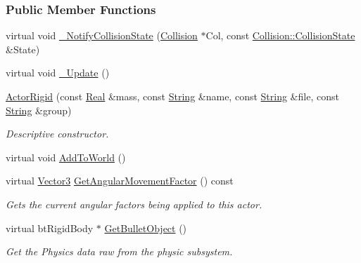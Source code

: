 \subsubsection*{Public Member Functions}
\begin{DoxyCompactItemize}
\item 
virtual void \hyperlink{classMezzanine_1_1ActorRigid_a68827280395bc3b9e0266710ec44247d}{\_\-NotifyCollisionState} (\hyperlink{classMezzanine_1_1Collision}{Collision} $\ast$Col, const \hyperlink{classMezzanine_1_1Collision_a24094c597061743dcd571f36077f4d19}{Collision::CollisionState} \&State)
\item 
virtual void \hyperlink{classMezzanine_1_1ActorRigid_a714d836a18ddb4de65bec5afdfdbb81c}{\_\-Update} ()
\item 
\hyperlink{classMezzanine_1_1ActorRigid_ad528a1f2c563dc121e38524f5412e182}{ActorRigid} (const \hyperlink{namespaceMezzanine_a726731b1a7df72bf3583e4a97282c6f6}{Real} \&mass, const \hyperlink{namespaceMezzanine_acf9fcc130e6ebf08e3d8491aebcf1c86}{String} \&name, const \hyperlink{namespaceMezzanine_acf9fcc130e6ebf08e3d8491aebcf1c86}{String} \&file, const \hyperlink{namespaceMezzanine_acf9fcc130e6ebf08e3d8491aebcf1c86}{String} \&group)
\begin{DoxyCompactList}\small\item\em Descriptive constructor. \item\end{DoxyCompactList}\item 
virtual void \hyperlink{classMezzanine_1_1ActorRigid_a5934a8751b9ec19dd2cd9327ce651d59}{AddToWorld} ()
\item 
virtual \hyperlink{classMezzanine_1_1Vector3}{Vector3} \hyperlink{classMezzanine_1_1ActorRigid_ac2b338b867bfd7d2e322a834e308a957}{GetAngularMovementFactor} () const 
\begin{DoxyCompactList}\small\item\em Gets the current angular factors being applied to this actor. \item\end{DoxyCompactList}\item 
virtual btRigidBody $\ast$ \hyperlink{classMezzanine_1_1ActorRigid_aec84029880e2cebf3cc154ada813a372}{GetBulletObject} ()
\begin{DoxyCompactList}\small\item\em Get the Physics data raw from the physic subsystem. \item\end{DoxyCompactList}\item 

\end{DoxyCompactItemize}
